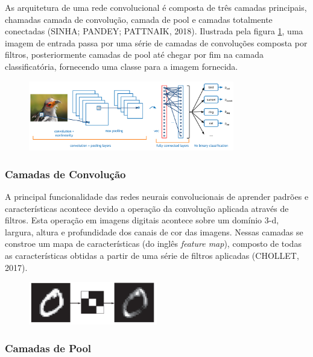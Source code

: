 \documentclass[12pt]{report}
\begin{document}
As arquitetura de uma rede convolucional é composta de três camadas principais, chamadas camada de convolução, camada de pool e camadas totalmente conectadas (SINHA; PANDEY; PATTNAIK, 2018). Ilustrada pela figura \ref{fig:passaro}, uma imagem de entrada passa por uma série de camadas de convoluções composta por filtros, posteriormente camadas de pool até chegar por fim na camada classificatória, fornecendo uma classe para a imagem fornecida.

\begin{figure}
    \centering
    \includegraphics[width=0.8\textwidth]{images/passaro.png}
    \caption{}
    \label{fig:passaro}
\end{figure}

\subsubsection{Camadas de Convolução}

A principal funcionalidade das redes neurais convolucionais de aprender padrões e características acontece devido a operação da convolução aplicada através de filtros. Esta operação em imagens digitais acontece sobre um domínio 3-d, largura, altura e profundidade dos canais de cor das imagens. Nessas camadas se constroe um mapa de características (do inglês \textit{feature map}), composto de todas as características obtidas a partir de uma série de filtros aplicadas (CHOLLET, 2017).

\begin{figure}
    \centering
    \includegraphics[width=0.5\textwidth]{images/zero.png}
    \caption{}
    \label{fig:zero}
\end{figure}

\subsubsection{Camadas de Pool}
\end{document}
